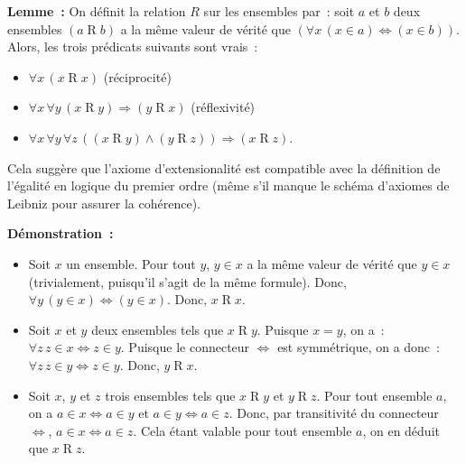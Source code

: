 \noindent\textbf{Lemme :} 
    On définit la relation $R$ sur les ensembles par : soit $a$ et $b$ deux ensembles $(a \mathrel{R} b)$ a la même valeur de vérité que $(\forall x \, (x \in a) \Leftrightarrow (x \in b))$. 
    Alors, les trois prédicats suivants sont vrais :
    \begin{itemize}[nosep]
        \item $\forall x \, (x \mathrel{R} x)$ (réciprocité)
        \item $\forall x \, \forall y \, (x \mathrel{R} y) \Rightarrow (y \mathrel{R} x)$ (réflexivité)
        \item $\forall x \, \forall y \, \forall z \, ((x \mathrel{R} y) \wedge (y \mathrel{R} z)) \Rightarrow (x \mathrel{R} z)$.
    \end{itemize}
    Cela suggère que l'axiome d'extensionalité est compatible avec la définition de l'égalité en logique du premier ordre (même s'il manque le schéma d'axiomes de Leibniz pour assurer la cohérence).

\medskip

\noindent\textbf{Démonstration :} 
\begin{itemize}[nosep]
    \item Soit $x$ un ensemble. Pour tout $y$, $y \in x$ a la même valeur de vérité que $y \in x$ (trivialement, puisqu'il s'agit de la même formule).
        Donc, $\forall y \, (y \in x) \Leftrightarrow (y \in x)$. 
        Donc, $x \mathrel{R} x$.
    \item Soit $x$ et $y$ deux ensembles tels que $x \mathrel{R} y$. 
        Puisque $x = y$, on a : $\forall z \, z \in x \Leftrightarrow z \in y$. 
        Puisque le connecteur $\Leftrightarrow$ est symmétrique, on a donc : $\forall z \, z \in y \Leftrightarrow z \in y$.
        Donc, $y \mathrel{R} x$.
    \item Soit $x$, $y$ et $z$ trois ensembles tels que $x \mathrel{R} y$ et $y \mathrel{R} z$. 
        Pour tout ensemble $a$, on a $a \in x \Leftrightarrow a \in y$ et $a \in y \Leftrightarrow a \in z$. 
        Donc, par transitivité du connecteur $\Leftrightarrow$, $a \in x \Leftrightarrow a \in z$. 
        Cela étant valable pour tout ensemble $a$, on en déduit que $x \mathrel{R} z$.
\end{itemize}
\done

\medskip


